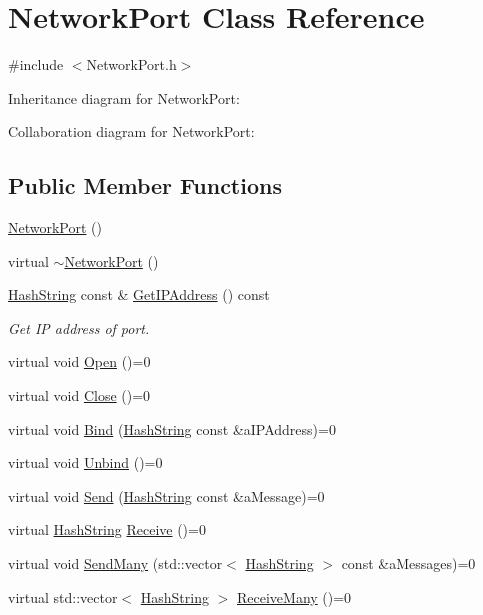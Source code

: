 \hypertarget{classNetworkPort}{}\section{Network\+Port Class Reference}
\label{classNetworkPort}


{\ttfamily \#include $<$Network\+Port.\+h$>$}



Inheritance diagram for Network\+Port\+:


Collaboration diagram for Network\+Port\+:
\subsection*{Public Member Functions}
\begin{DoxyCompactItemize}
\item 
\hyperlink{classNetworkPort_a11fdeae6be4ad423a578dcbf31426327}{Network\+Port} ()
\item 
virtual \hyperlink{classNetworkPort_a68e0bc74ffb6a7394132d24dc24204d0}{$\sim$\+Network\+Port} ()
\item 
\hyperlink{classHashString}{Hash\+String} const \& \hyperlink{classNetworkPort_a7f2d06742bb33abbab27f4b4ee6d73a3}{Get\+I\+P\+Address} () const 
\begin{DoxyCompactList}\small\item\em Get IP address of port. \end{DoxyCompactList}\item 
virtual void \hyperlink{classNetworkPort_a8a2a377fe0d6aaadf27504c29c9809ca}{Open} ()=0
\item 
virtual void \hyperlink{classNetworkPort_afefdf2ab817dfda929aa0af2cf8363a9}{Close} ()=0
\item 
virtual void \hyperlink{classNetworkPort_ae773c0c3c51185b2391fa263b9f65ff4}{Bind} (\hyperlink{classHashString}{Hash\+String} const \&a\+I\+P\+Address)=0
\item 
virtual void \hyperlink{classNetworkPort_ab8f76e087b0d1c0a4e509c056306810a}{Unbind} ()=0
\item 
virtual void \hyperlink{classNetworkPort_a95fd698a221ce5170ab2a875b27efc94}{Send} (\hyperlink{classHashString}{Hash\+String} const \&a\+Message)=0
\item 
virtual \hyperlink{classHashString}{Hash\+String} \hyperlink{classNetworkPort_a0e831c922af9283aa07f3a598312c99f}{Receive} ()=0
\item 
virtual void \hyperlink{classNetworkPort_ab3549cb547fa823c0b52e1f5cf38d601}{Send\+Many} (std\+::vector$<$ \hyperlink{classHashString}{Hash\+String} $>$ const \&a\+Messages)=0
\item 
virtual std\+::vector$<$ \hyperlink{classHashString}{Hash\+String} $>$ \hyperlink{classNetworkPort_a54c68c6b9b9bc195486d9fcb5e49d9c7}{Receive\+Many} ()=0
\end{DoxyCompactItemize}
